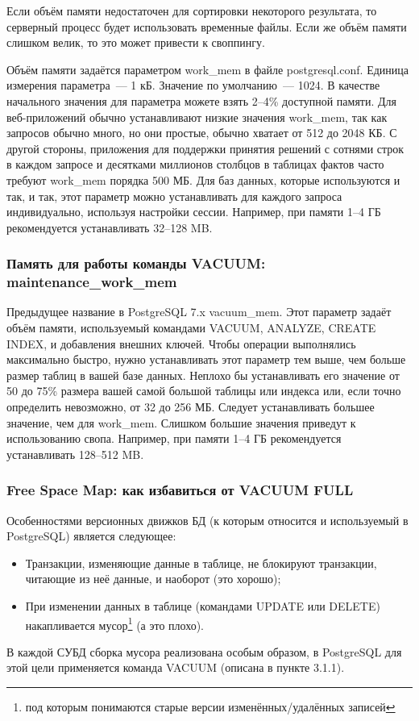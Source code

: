 Если объём памяти недостаточен для сортировки некоторого результата, то серверный процесс будет использовать 
временные файлы. Если же объём памяти слишком велик, то это может привести к своппингу.

Объём памяти задаётся параметром work\_mem в файле postgresql.conf. Единица измерения параметра~--- 1 кБ. 
Значение по умолчанию~--- 1024. В качестве начального значения для параметра можете взять 2--4\% доступной памяти.
Для веб-приложений обычно устанавливают низкие значения work\_mem, так как запросов обычно много, но они простые, обычно хватает 
от 512 до 2048 КБ. С другой стороны, приложения для поддержки принятия решений с сотнями строк в каждом запросе и десятками 
миллионов столбцов  в таблицах фактов часто требуют work\_mem порядка 500 МБ. Для баз данных, которые используются и так, и так, 
этот параметр можно устанавливать для каждого запроса индивидуально, используя настройки сессии. Например, 
при памяти 1--4 ГБ рекомендуется устанавливать 32--128 MB. 

\subsubsection{Память для работы команды VACUUM: maintenance\_work\_mem}
Предыдущее название в PostgreSQL 7.x vacuum\_mem. Этот параметр задаёт объём памяти, используемый командами 
VACUUM, ANALYZE, CREATE INDEX, и добавления внешних ключей. 
Чтобы операции выполнялись максимально быстро, нужно устанавливать этот параметр тем выше, чем больше размер таблиц в 
вашей базе данных. Неплохо бы устанавливать его значение от 50 до 75\% размера вашей самой большой таблицы или индекса или, 
если точно определить невозможно, от 32 до 256 МБ. Следует устанавливать большее значение, чем для work\_mem. 
Слишком большие значения приведут к использованию свопа. Например, при памяти 1--4 ГБ рекомендуется устанавливать 128--512 MB.

\subsubsection{Free Space Map: как избавиться от VACUUM FULL}
Особенностями версионных движков БД (к которым относится и используемый в PostgreSQL) является следующее:
\begin{itemize}
\item Транзакции, изменяющие данные в таблице, не блокируют транзакции, читающие из неё данные, и наоборот (это хорошо);
\item При изменении данных в таблице (командами UPDATE или DELETE) накапливается мусор\footnote{под которым понимаются 
старые версии изменённых/удалённых записей} (а это плохо).
\end{itemize}
В каждой СУБД сборка мусора реализована особым образом, в PostgreSQL для этой цели применяется команда VACUUM (описана в пункте 3.1.1).

